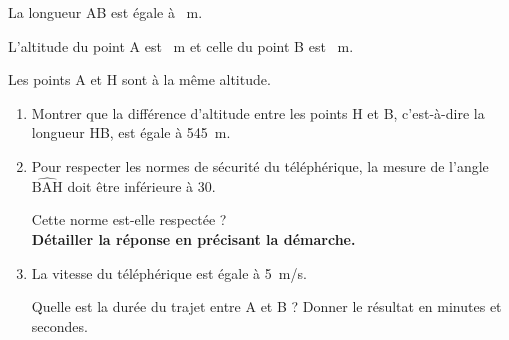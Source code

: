 La longueur AB est égale à ~m.

L'altitude du point A est ~m et celle du point B est ~m.

Les points A et H sont à la même altitude.

\begin{enumerate}
	\item Montrer que la différence d'altitude entre les points H et B, c'est-à-dire la longueur HB, est égale à 545~m.
	\item Pour respecter les normes de sécurité du téléphérique, la mesure de l'angle $\widehat{\mathrm{BAH}}$ doit être inférieure à 30\degres.

	Cette norme est-elle respectée ?\\
	\textbf{Détailler la réponse en précisant la démarche.}
	\item La vitesse du téléphérique est égale à 5~m/s.

	Quelle est la durée du trajet entre A et B ? Donner le résultat en minutes et secondes.
\end{enumerate}


